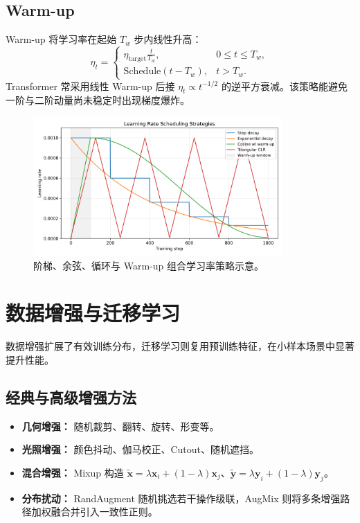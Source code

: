 \documentclass[UTF8,zihao=-4]{ctexart}
\begin{document}
\subsection{Warm-up}
Warm-up 将学习率在起始 $T_w$ 步内线性升高：
\begin{equation}
  \eta_t =
  \begin{cases}
    \eta_{\mathrm{target}} \frac{t}{T_w}, & 0 \le t \le T_w, \\
    \text{Schedule}(t - T_w), & t > T_w.
  \end{cases}
\end{equation}
Transformer 常采用线性 Warm-up 后接 $\eta_t \propto t^{-1/2}$ 的逆平方衰减。该策略能避免一阶与二阶动量尚未稳定时出现梯度爆炸。

\begin{figure}[H]
  \centering
  \includegraphics[width=0.85\textwidth]{learning_rate_policies.png}
  \caption{阶梯、余弦、循环与 Warm-up 组合学习率策略示意。}
  \label{fig:learning_rate_policies_cn}
\end{figure}
\FloatBarrier

\section{数据增强与迁移学习}
数据增强扩展了有效训练分布，迁移学习则复用预训练特征，在小样本场景中显著提升性能。

\subsection{经典与高级增强方法}
\begin{itemize}
  \item \textbf{几何增强：} 随机裁剪、翻转、旋转、形变等。
  \item \textbf{光照增强：} 颜色抖动、伽马校正、Cutout、随机遮挡。
  \item \textbf{混合增强：} Mixup 构造 $\tilde{\mathbf{x}} = \lambda \mathbf{x}_i + (1-\lambda)\mathbf{x}_j$、$\tilde{\mathbf{y}} = \lambda \mathbf{y}_i + (1-\lambda)\mathbf{y}_j$。
  \item \textbf{分布扰动：} RandAugment 随机挑选若干操作级联，AugMix 则将多条增强路径加权融合并引入一致性正则。
\end{itemize}
\end{document}

